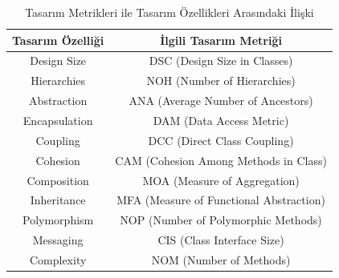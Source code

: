 \documentclass[conference]{IEEEtran}
\begin{document}
\begin{table}[h]
	\centering
	\begin{tabular}{|c|c|}
		\hline
		\textbf{Tasarım Özelliği} & \textbf{İlgili Tasarım Metriği} \\
		\hline
		Design Size & DSC (Design Size in Classes) \\
		\hline
		Hierarchies & NOH (Number of Hierarchies) \\
		\hline
		Abstraction & ANA (Average Number of Ancestors) \\
		\hline
		Encapsulation & DAM (Data Access Metric) \\
		\hline
		Coupling & DCC (Direct Class Coupling) \\
		\hline
		Cohesion & CAM (Cohesion Among Methods in Class) \\
		\hline
		Composition & MOA (Measure of Aggregation) \\
		\hline
		Inheritance & MFA (Measure of Functional Abstraction) \\
		\hline
		Polymorphism & NOP (Number of Polymorphic Methods) \\
		\hline
		Messaging & CIS (Class Interface Size) \\
		\hline
		Complexity & NOM (Number of Methods) \\
		\hline
	\end{tabular}
	\caption{Tasarım Metrikleri ile Tasarım Özellikleri Arasındaki İlişki}
	\label{table:1}
\end{table}
\end{document}

